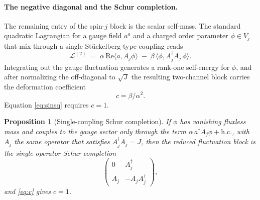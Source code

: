 \documentclass[aps,prl,twocolumn,superscriptaddress,floatfix,nofootinbib,reprint]{revtex4-2}
\newtheorem{proposition}{Proposition}
\begin{document}

\paragraph{The negative diagonal and the Schur completion.}
The remaining entry of the spin-$j$ block is the scalar self-mass.  The
standard quadratic Lagrangian for a gauge field $a^{a}$ and a charged
order parameter $\phi\in V_{j}$ that mix through a single
Stückelberg-type coupling reads
\begin{equation}
  \mathcal{L}^{(2)}\;=\;\alpha\,\mathrm{Re}\langle a,A_{j}\phi\rangle\;-\;\beta\,\langle\phi,A_{j}^{\dagger}A_{j}\,\phi\rangle.
\label{eq:lag}
\end{equation}
Integrating out the gauge fluctuation generates a rank-one self-energy
for $\phi$, and after normalizing the off-diagonal to $\sqrt{J}$ the
resulting two-channel block carries the deformation coefficient
\begin{equation}
  c=\beta/\alpha^{2}.
\label{eq:c}
\end{equation}
Equation \eqref{eq:sinsq} requires $c=1$.

\begin{proposition}[Single-coupling Schur completion]
\label{prop:c1}
If $\phi$ has vanishing fluxless mass and couples to the gauge sector
only through the term $\alpha\,a^{\dagger}A_{j}\phi+\mathrm{h.c.}$,
with $A_{j}$ the same operator that satisfies $A_{j}^{\dagger}A_{j}=J$,
then the reduced fluctuation block is the single-operator Schur
completion
\begin{equation}
  \begin{pmatrix} 0 & A_{j}^{\dagger}\\ A_{j} & -A_{j}A_{j}^{\dagger}\end{pmatrix},
\label{eq:schur}
\end{equation}
and \eqref{eq:c} gives $c=1$.
\end{proposition}
\end{document}
